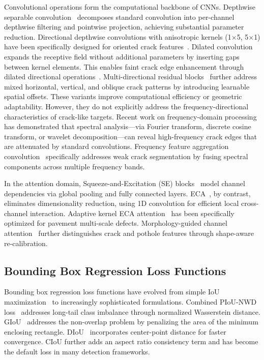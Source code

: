 \documentclass{ieeeaccess}
\begin{document}
Convolutional operations form the computational backbone of CNNs. Depthwise separable convolution~\cite{qu2024directional} decomposes standard convolution into per-channel depthwise filtering and pointwise projection, achieving substantial parameter reduction. Directional depthwise convolutions with anisotropic kernels (1$\times$5, 5$\times$1) have been specifically designed for oriented crack features~\cite{qu2024directional}. Dilated convolution~\cite{li2024multidirection} expands the receptive field without additional parameters by inserting gaps between kernel elements. This enables faint crack edge enhancement through dilated directional operations~\cite{li2024multidirection}. Multi-directional residual blocks~\cite{li2024multidirection} further address mixed horizontal, vertical, and oblique crack patterns by introducing learnable spatial offsets. These variants improve computational efficiency or geometric adaptability. However, they do not explicitly address the frequency-directional characteristics of crack-like targets. Recent work on frequency-domain processing~\cite{zhu2025fdyolo, plosone2026yolo11fr, wang2026highwayfreq, wang2026freqseg} has demonstrated that spectral analysis---via Fourier transform, discrete cosine transform, or wavelet decomposition---can reveal high-frequency crack edges that are attenuated by standard convolutions. Frequency feature aggregation convolution~\cite{wang2026freqseg} specifically addresses weak crack segmentation by fusing spectral components across multiple frequency bands.

In the attention domain, Squeeze-and-Excitation (SE) blocks~\cite{hu2018squeeze} model channel dependencies via global pooling and fully connected layers. ECA~\cite{wang2020eca}, by contrast, eliminates dimensionality reduction, using 1D convolution for efficient local cross-channel interaction. Adaptive kernel ECA attention~\cite{electronics2025ecayolo} has been specifically optimized for pavement multi-scale defects. Morphology-guided channel attention~\cite{asce2026morphattn} further distinguishes crack and pothole features through shape-aware re-calibration.

\subsection{Bounding Box Regression Loss Functions}

Bounding box regression loss functions have evolved from simple IoU maximization~\cite{zhang2025nwdpiu} to increasingly sophisticated formulations. Combined PIoU-NWD loss~\cite{zhang2025nwdpiu} addresses long-tail class imbalance through normalized Wasserstein distance. GIoU~\cite{rezatofighi2019giou} addresses the non-overlap problem by penalizing the area of the minimum enclosing rectangle. DIoU~\cite{zheng2020diou} incorporates center-point distance for faster convergence. CIoU further adds an aspect ratio consistency term and has become the default loss in many detection frameworks.
\end{document}
